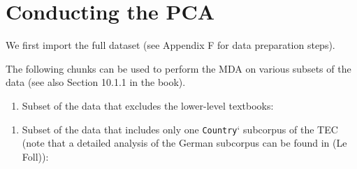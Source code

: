\documentclass[
  letterpaper,
  DIV=11,
  numbers=noendperiod]{scrreprt}
\newenvironment{Shaded}{\begin{snugshade}}{\end{snugshade}}
\newcommand{\CommentTok}[1]{\textcolor[rgb]{0.37,0.37,0.37}{#1}}
\newcommand{\FunctionTok}[1]{\textcolor[rgb]{0.28,0.35,0.67}{#1}}
\newcommand{\NormalTok}[1]{\textcolor[rgb]{0.00,0.23,0.31}{#1}}
\newcommand{\OtherTok}[1]{\textcolor[rgb]{0.00,0.23,0.31}{#1}}
\newcommand{\SpecialCharTok}[1]{\textcolor[rgb]{0.37,0.37,0.37}{#1}}
\newcommand{\StringTok}[1]{\textcolor[rgb]{0.13,0.47,0.30}{#1}}
\providecommand{\tightlist}{%
  \setlength{\itemsep}{0pt}\setlength{\parskip}{0pt}}\usepackage{longtable,booktabs,array}
\begin{document}
\section{Conducting the PCA}\label{conducting-the-pca}

We first import the full dataset (see Appendix F for data preparation
steps).

The following chunks can be used to perform the MDA on various subsets
of the data (see also Section 10.1.1 in the book).

\begin{enumerate}
\def\labelenumi{\roman{enumi}.}
\tightlist
\item
  Subset of the data that excludes the lower-level textbooks:
\end{enumerate}

\begin{Shaded}
\end{Shaded}

\begin{enumerate}
\def\labelenumi{\roman{enumi}.}
\tightlist
\item
  Subset of the data that includes only one \texttt{Country}` subcorpus
  of the TEC (note that a detailed analysis of the German subcorpus can
  be found in (Le Foll)):
\end{enumerate}

\begin{Shaded}
\end{Shaded}
\end{document}
